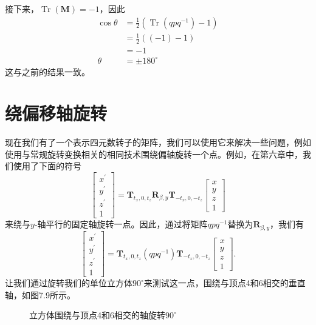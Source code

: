 接下来，$\operatorname{Tr}(\mathbf{M})=-1$，因此
$$
\begin{aligned}
\cos \theta & =\frac{1}{2}\left(\operatorname{Tr}\left(q p q^{-1}\right)-1\right) \\
& =\frac{1}{2}((-1)-1) \\
& =-1 \\
\theta & =\pm 180^{\circ}
\end{aligned}
$$
这与之前的结果一致。

\section{绕偏移轴旋转}
现在我们有了一个表示四元数转子的矩阵，我们可以使用它来解决一些问题，例如使用与常规旋转变换相关的相同技术围绕偏轴旋转一个点。例如，在第六章中，我们使用了下面的符号
$$
\left[\begin{array}{c}
x^{\prime} \\
y^{\prime} \\
z^{\prime} \\
1
\end{array}\right]=\mathbf{T}_{t_{x}, 0, t_{z}} \mathbf{R}_{\beta, y} \mathbf{T}_{-t_{x}, 0,-t_{z}}\left[\begin{array}{c}
x \\
y \\
z \\
1
\end{array}\right]
$$
来绕与$y$-轴平行的固定轴旋转一点。因此，通过将矩阵$q p q^{-1}$替换为$\mathbf{R}_{\beta, y}$，我们有
$$
\left[\begin{array}{c}
x^{\prime} \\
y^{\prime} \\
z^{\prime} \\
1
\end{array}\right]=\mathbf{T}_{t_{x}, 0, t_{z}}\left(q p q^{-1}\right) \mathbf{T}_{-t_{x}, 0,-t_{z}}\left[\begin{array}{c}
x \\
y \\
z \\
1
\end{array}\right] .
$$
让我们通过旋转我们的单位立方体$90^{\circ}$来测试这一点，围绕与顶点4和6相交的垂直轴，如图7.9所示。

\begin{figure}[h!]
    \centering
    \caption[short]{立方体围绕与顶点4和6相交的轴旋转$90^{\circ}$}
\end{figure}

